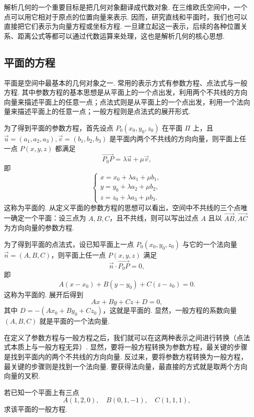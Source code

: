 解析几何的一个重要目标是把几何对象翻译成代数对象. 在三维欧氏空间中，一个点可以用它相对于原点的位置向量来表示. 因而，研究直线和平面时，我们也可以直接把它们表示为向量方程或坐标方程. 一旦建立起这一表示，后续的各种位置关系、距离公式等都可以通过代数运算来处理，这也是解析几何的核心思想.

\subsection{平面的方程}

平面是空间中最基本的几何对象之一. 常用的表示方式有参数方程、点法式与一般方程. 其中参数方程的基本思想是从平面上的一个点出发，利用两个不共线的方向向量来描述平面上的任意一点；点法式则是从平面上的一个点出发，利用一个法向量来描述平面上的任意一点；一般方程则是点法式的展开形式.

为了得到平面的参数方程，首先设点 $P_0(x_0, y_0, z_0)$ 在平面 $\Pi$ 上，且 $\vec{u} = (a_1, a_2, a_3), \vec{v} = (b_1, b_2, b_3)$ 是平面内两个不共线的方向向量，则平面上任一点 $P(x, y, z)$ 都满足
\[
    \overrightarrow{P_0P} = \lambda \vec{u} + \mu \vec{v},
\]
即
\[
    \begin{cases}
        x = x_0 + \lambda a_1 + \mu b_1, \\
        y = y_0 + \lambda a_2 + \mu b_2, \\
        z = z_0 + \lambda a_3 + \mu b_3.
    \end{cases}
\]
这称为平面的. 从定义平面的参数方程的思想可以看出，空间中不共线的三个点唯一确定一个平面：设三点为 $A, B, C$，且不共线，则可以写出过点 $A$ 且以 $\overrightarrow{AB}, \overrightarrow{AC}$ 为方向向量的参数方程.

为了得到平面的点法式，设已知平面上一点 $P_0(x_0, y_0, z_0)$ 与它的一个法向量 $\vec{n} = (A, B, C)$，则平面上任一点 $P(x, y, z)$ 满足
\[
    \vec{n}\cdot \overrightarrow{P_0P} = 0,
\]
即
\[
    A(x - x_0) + B(y - y_0) + C(z - z_0) = 0.
\]
这称为平面的. 展开后得到
\[
    A x + B y + C z + D = 0,
\]
其中 $D = - (A x_0 + B y_0 + C z_0)$，这就是平面的. 显然，一般方程的系数向量 $(A, B, C)$ 就是平面的一个法向量.

在定义了参数方程与一般方程之后，我们就可以在这两种表示之间进行转换（点法式本质上与一般方程无异）. 显然，要将一般方程转换为参数方程，最关键的步骤是找到平面内的两个不共线的方向向量. 反过来，要将参数方程转换为一般方程，最关键的步骤则是找到一个法向量. 要获得法向量，最直接的方式就是取两个方向向量的叉积.

\begin{example}{}{}
    若已知一个平面上有三点
    \[
        A(1, 2, 0), \quad B(0, 1, -1), \quad C(1, 1, 1),
    \]
    求该平面的一般方程.
\end{example}

